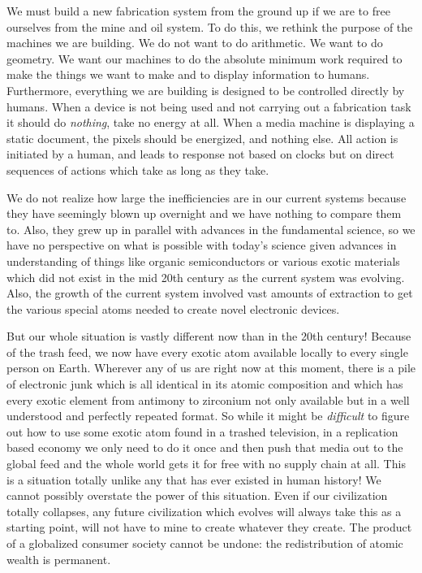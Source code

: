 We must build a new fabrication system from the ground up if we are to
free ourselves from the mine and oil system. To do this, we rethink the
purpose of the machines we are building. We do not want to do
arithmetic. We want to do geometry. We want our machines to do the
absolute minimum work required to make the things we want to make and to
display information to humans. Furthermore, everything we are building
is designed to be controlled directly by humans. When a device is not
being used and not carrying out a fabrication task it should do
\emph{nothing}, take no energy at all. When a media machine is
displaying a static document, the pixels should be energized, and
nothing else. All action is initiated by a human, and leads to response
not based on clocks but on direct sequences of actions which take as
long as they take.

We do not realize how large the inefficiencies are in our current
systems because they have seemingly blown up overnight and we have
nothing to compare them to. Also, they grew up in parallel with advances
in the fundamental science, so we have no perspective on what is
possible with today's science given advances in understanding of things
like organic semiconductors or various exotic materials which did not
exist in the mid 20th century as the current system was evolving. Also,
the growth of the current system involved vast amounts of extraction to
get the various special atoms needed to create novel electronic devices.

But our whole situation is vastly different now than in the 20th
century! Because of the trash feed, we now have every exotic atom
available locally to every single person on Earth. Wherever any of us
are right now at this moment, there is a pile of electronic junk which
is all identical in its atomic composition and which has every exotic
element from antimony to zirconium not only available but in a well
understood and perfectly repeated format. So while it might be
\emph{difficult} to figure out how to use some exotic atom found in a
trashed television, in a replication based economy we only need to do it
once and then push that media out to the global feed and the whole world
gets it for free with no supply chain at all. This is a situation
totally unlike any that has ever existed in human history! We cannot
possibly overstate the power of this situation. Even if our civilization
totally collapses, any future civilization which evolves will always
take this as a starting point, will not have to mine to create whatever
they create. The product of a globalized consumer society cannot be
undone: the redistribution of atomic wealth is permanent.

